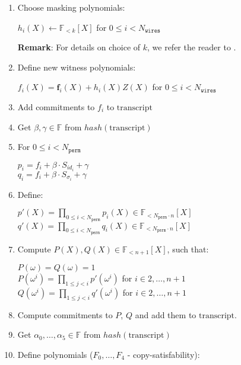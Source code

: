 \begin{enumerate}
    \item Choose masking polynomials:
    \begin{center}
        $h_i(X) \leftarrow \mathbb{F}_{<k}[X]$ for $0 \leq i < N_{\texttt{wires}}$
    \end{center}
    \textbf{Remark}: For details on choice of $k$, we refer the reader to \cite{cryptoeprint:2019:1400}.
    \item Define new witness polynomials:
    \begin{center}
        $f_i(X) = \textbf{f}_{i}(X) + h_i(X)Z(X)$ for $0 \leq i < N_{\texttt{wires}}$
    \end{center}
    \item Add commitments to $f_i$ to $\text{transcript}$
    \item Get $\beta, \gamma \in \mathbb{F}$ from $hash(\text{transcript})$
    \item For $0 \leq i < N_{\texttt{perm}}$
    \begin{center}
        $p_i = f_i + \beta \cdot S_{id_i} + \gamma$ \\
        $q_i = f_i + \beta \cdot S_{\sigma_i} + \gamma$
    \end{center}
    \item Define:
    \begin{center}
        $p'(X) = \prod\limits_{0 \leq i < N_{\texttt{perm}}} p_i(X) \in \mathbb{F}_{<N_{\texttt{perm}} \cdot n}[X]$ \\
        $q'(X) = \prod\limits_{0 \leq i < N_{\texttt{perm}}} q_i(X) \in \mathbb{F}_{<N_{\texttt{perm}} \cdot n}[X]$
    \end{center}
    \item Compute $P(X), Q(X) \in \mathbb{F}_{<n+1}[X]$, such that:
    \begin{center}
        $P(\omega) = Q(\omega) = 1$ \\
        $P(\omega^i) = \prod\limits_{1 \leq j < i}p'(\omega^i)$ for $i \in {2, \dots, n + 1}$ \\
        $Q(\omega^i) = \prod\limits_{1 \leq j < i}q'(\omega^i)$ for $i \in {2, \dots, n + 1}$ \\
    \end{center}
    \item Compute commitments to $P$, $Q$ and add them to $\text{transcript}$.
    \item Get $\alpha_0, \dots, \alpha_5 \in \mathbb{F}$ from $hash(\text{transcript})$
    \item Define polynomials ($F_0, \dots, F_4$ - copy-satisfability):

\end{enumerate}
